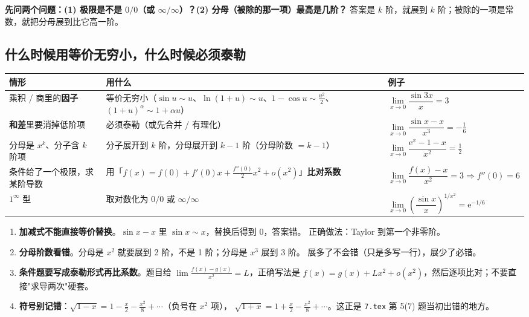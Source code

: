 \documentclass[11pt,a4paper]{ctexart}
\newcommand{\ee}{\mathrm{e}}
\begin{document}
\begin{keypoint}[一句话总纲]
\textbf{先问两个问题：(1) 极限是不是 $0/0$（或 $\infty/\infty$）？(2) 分母（被除的那一项）最高是几阶？}
答案是 $k$ 阶，就展到 $k$ 阶；被除的一项是常数，就把分母展到比它高一阶。
\end{keypoint}

\subsection{什么时候用等价无穷小，什么时候必须泰勒}

\begin{center}
\footnotesize
\renewcommand{\arraystretch}{1.3}
\begin{tabularx}{\textwidth}{@{}>{\raggedright\arraybackslash}p{3.9cm} >{\raggedright\arraybackslash}p{5.2cm} X@{}}
\toprule
\textbf{情形} & \textbf{用什么} & \textbf{例子}\\
\midrule
乘积 / 商里的\textbf{因子} & 等价无穷小（$\sin u\sim u$、$\ln(1+u)\sim u$、$1-\cos u\sim\frac{u^2}2$、$(1+u)^\alpha\sim1+\alpha u$） &
$\lim\limits_{x\to0}\dfrac{\sin 3x}{x}=3$\\
\textbf{和差}里要消掉低阶项 & 必须泰勒（或先合并 / 有理化） &
$\lim\limits_{x\to0}\dfrac{\sin x-x}{x^3}=-\frac16$\\
分母是 $x^k$、分子含 $k$ 阶项 & 分子展开到 $k$ 阶，分母展开到 $k-1$ 阶（分母阶数 $=k-1$） &
$\lim\limits_{x\to0}\dfrac{\ee^x-1-x}{x^2}=\frac12$\\
条件给了一个极限，求某阶导数 & 用「$f(x)=f(0)+f'(0)x+\frac{f''(0)}{2}x^2+o(x^2)$」\textbf{比对系数} &
$\lim\limits_{x\to0}\dfrac{f(x)-x}{x^2}=3\Rightarrow f''(0)=6$\\
$1^\infty$ 型 & 取对数化为 $0/0$ 或 $\infty/\infty$ &
$\lim\limits_{x\to0}\left(\dfrac{\sin x}{x}\right)^{1/x^2}=\ee^{-1/6}$\\
\bottomrule
\end{tabularx}
\end{center}

\begin{warnbox}
\begin{enumerate}[label=(\alph*)]
  \item \textbf{加减式不能直接等价替换}。$\sin x - x$ 里 $\sin x\sim x$，替换后得到 $0$，答案错。
  正确做法：Taylor 到第一个非零阶。
  \item \textbf{分母阶数看错}。分母是 $x^2$ 就要展到 2 阶，不是 1 阶；分母是 $x^3$ 展到 3 阶。
  展多了不会错（只是多写一行），展少了必错。
  \item \textbf{条件题要写成泰勒形式再比系数}。题目给 $\lim\frac{f(x)-g(x)}{x^2}=L$，正确写法是
  $f(x)=g(x)+Lx^2+o(x^2)$，然后逐项比对；不要直接"求导两次"硬套。
  \item \textbf{符号别记错}：$\sqrt{1-x}=1-\frac{x}{2}-\frac{x^2}{8}+\cdots$（负号在 $x^2$ 项），
  $\sqrt{1+x}=1+\frac{x}{2}-\frac{x^2}{8}+\cdots$。这正是 \texttt{7.tex} 第 5(7) 题当初出错的地方。
\end{enumerate}
\end{warnbox}
\end{document}

